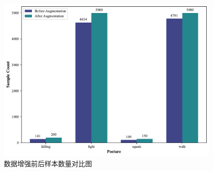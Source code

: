 \begin{figure}[htbp]
    \centering
    \includegraphics[width=1\linewidth]{imgs/data_augment_sample_quantities_comparison.pdf}
    \caption{数据增强前后样本数量对比图}
    \label{fig:data_augment_sample_quantities_comparison}
\end{figure}

